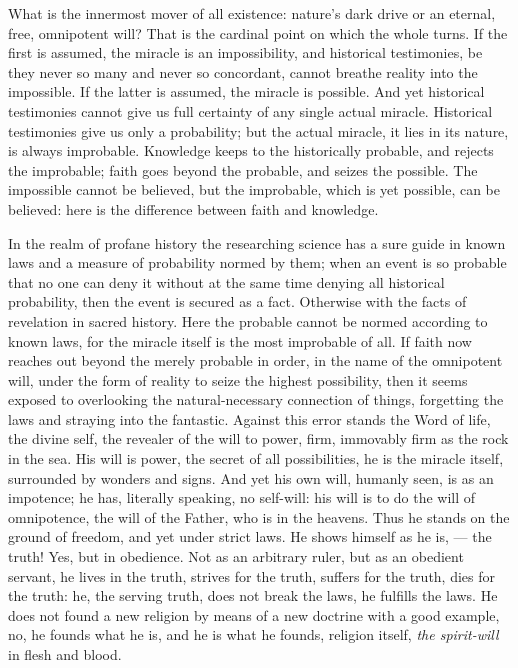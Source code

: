 \documentclass[12pt,a4paper,openany]{book}
\newcommand{\opage}[1]{\marginnote{\footnotesize\textit{[#1]}}}
\begin{document}
What is the innermost mover of all existence: nature's
dark drive or an eternal, free, omnipotent will? That is the cardinal point
on which the whole turns. If the
first is assumed, the miracle is an impossibility, and historical testimonies,
be they never so many and never so concordant,
cannot breathe reality into the impossible.
If the latter is assumed, the miracle is possible. And yet
historical testimonies cannot give us full certainty of any
single actual miracle. Historical testimonies
give us only a probability; but the actual miracle,
\setcounter{footnote}{0}%
\opage{51}it lies in its nature, is always improbable. Knowledge keeps
to the historically probable, and rejects the improbable;
faith goes beyond the probable, and seizes
the possible. The impossible cannot be believed, but the improbable,
which is yet possible, can be believed: here is the difference
between faith and knowledge.

In the realm of profane history the researching
science has a sure guide in known laws and a
measure of probability normed by them; when an event
is so probable that no one can deny it without
at the same time denying all historical probability, then
the event is secured as a fact. Otherwise
with the facts of revelation in sacred history.
Here the probable cannot be normed according to known
laws, for the miracle itself is the most improbable of
all. If faith now reaches out beyond the merely probable in order, in
the name of the omnipotent will, under the form of reality
to seize the highest possibility, then it seems exposed
to overlooking the natural-necessary connection of things,
forgetting the laws and straying into the fantastic. Against
this error stands the Word of life, the divine self,
the revealer of the will to power, firm, immovably firm as the rock
in the sea. His will is power, the secret of all possibilities,
he is the miracle itself, surrounded by wonders and signs.
And yet his own will, humanly seen, is as
an impotence; he has, literally speaking, no self-will: his
will is to do the will of omnipotence, the will of the Father, who
is in the heavens. Thus he stands on the ground of freedom, and
yet under strict laws. He shows himself as he is,
--- the truth! Yes, but in obedience. Not as an arbitrary
ruler, but as an obedient servant, he lives in the truth,
strives for the truth, suffers for the truth, dies
for the truth: he, the serving truth, does not break
the laws, he fulfills the laws. He does not found a new
religion by means of a new doctrine with a good example,
no, he founds what he is, and he is what he
founds, religion itself, \emph{the spirit-will} in flesh and blood.
\end{document}
